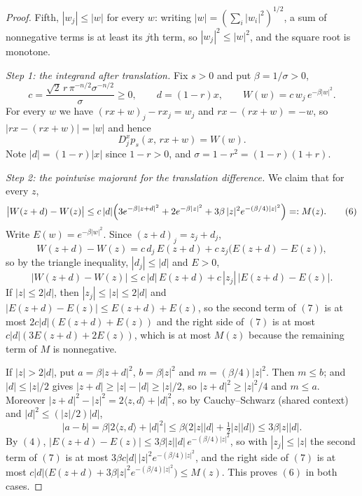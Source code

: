 \begin{proof}
Fifth, $|w_j| \leq |w|$ for every $w$: writing
$|w| = (\sum_i|w_i|^2)^{1/2}$, a sum of nonnegative terms is at least its $j$th
term, so $|w_j|^2 \leq |w|^2$, and the square root is monotone.

\emph{Step 1: the integrand after translation.}
Fix $s > 0$ and put $\beta = 1/\sigma > 0$,
\[
  c = \frac{\sqrt2\,r\,\pi^{-n/2}\sigma^{-n/2}}{\sigma} \geq 0,
  \qquad d = (1-r)x,
  \qquad W(w) = c\,w_j\,e^{-\beta|w|^2} .
\]
For every $w$ we have $(rx+w)_j - rx_j = w_j$ and $rx - (rx+w) = -w$, so
$|rx-(rx+w)| = |w|$ and hence
\begin{equation*}
  D_j^xp_s(x,\,rx+w) = W(w) . \tag{5}
\end{equation*}
Note $|d| = (1-r)|x|$ since $1-r > 0$, and $\sigma = 1-r^2 = (1-r)(1+r)$.

\emph{Step 2: the pointwise majorant for the translation difference.}
We claim that for every $z$,
\begin{equation*}
  \bigl|W(z+d)-W(z)\bigr|
    \leq c\,|d|\Bigl(3e^{-\beta|z+d|^2} + 2e^{-\beta|z|^2}
        + 3\beta\,|z|^2e^{-(\beta/4)|z|^2}\Bigr) =: M(z) . \tag{6}
\end{equation*}
Write $E(w) = e^{-\beta|w|^2}$.  Since $(z+d)_j = z_j + d_j$,
\[
  W(z+d)-W(z) = c\,d_j\,E(z+d) + c\,z_j\bigl(E(z+d)-E(z)\bigr) ,
\]
so by the triangle inequality, $|d_j| \leq |d|$ and $E > 0$,
\begin{equation*}
  \bigl|W(z+d)-W(z)\bigr|
    \leq c\,|d|\,E(z+d) + c\,|z_j|\,\bigl|E(z+d)-E(z)\bigr| . \tag{7}
\end{equation*}
If $|z| \leq 2|d|$, then $|z_j| \leq |z| \leq 2|d|$ and
$|E(z+d)-E(z)| \leq E(z+d)+E(z)$, so the second term of $(7)$ is at most
$2c|d|(E(z+d)+E(z))$ and the right side of $(7)$ is at most
$c|d|(3E(z+d)+2E(z))$, which is at most $M(z)$ because the remaining term of
$M$ is nonnegative.

If $|z| > 2|d|$, put $a = \beta|z+d|^2$, $b = \beta|z|^2$ and
$m = (\beta/4)|z|^2$.  Then $m \leq b$; and $|d| \leq |z|/2$ gives
$|z+d| \geq |z|-|d| \geq |z|/2$, so $|z+d|^2 \geq |z|^2/4$ and $m \leq a$.
Moreover $|z+d|^2 - |z|^2 = 2\langle z,d\rangle + |d|^2$, so by Cauchy--Schwarz
(shared context) and $|d|^2 \leq (|z|/2)|d|$,
\[
  |a-b| = \beta\bigl|2\langle z,d\rangle+|d|^2\bigr|
    \leq \beta\bigl(2|z||d| + \tfrac12|z||d|\bigr) \leq 3\beta|z||d| .
\]
By $(4)$, $|E(z+d)-E(z)| \leq 3\beta|z||d|\,e^{-(\beta/4)|z|^2}$, so with
$|z_j| \leq |z|$ the second term of $(7)$ is at most
$3\beta c|d|\,|z|^2e^{-(\beta/4)|z|^2}$, and the right side of $(7)$ is at most
$c|d|\bigl(E(z+d) + 3\beta|z|^2e^{-(\beta/4)|z|^2}\bigr) \leq M(z)$.  This
proves $(6)$ in both cases.


\end{proof}
